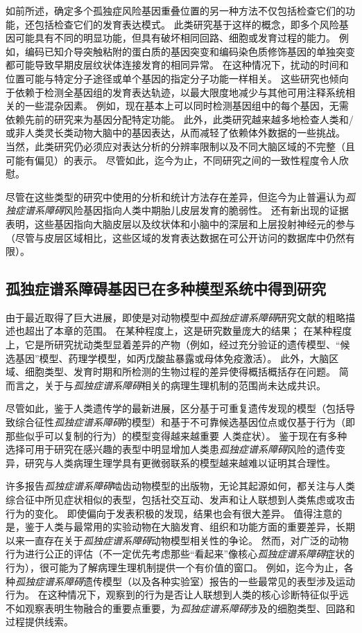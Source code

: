 如前所述，确定多个孤独症风险基因重叠位置的另一种方法不仅包括检查它们的功能，还包括检查它们的发育表达模式。
此类研究基于这样的概念，即多个风险基因可能具有不同的明显功能，但具有破坏相同回路、细胞或发育过程的能力。
例如，编码已知介导突触粘附的蛋白质的基因突变和编码染色质修饰基因的单独突变都可能导致早期皮层纹状体连接发育的相同异常。
在这种情况下，扰动的时间和位置可能与特定分子途径或单个基因的指定分子功能一样相关。
这些研究也倾向于依赖于检测全基因组的发育表达轨迹，以最大限度地减少与其他可用注释系统相关的一些混杂因素。
例如，现在基本上可以同时检测基因组中的每个基因，无需依赖先前的研究来为基因分配特定功能。
此外，此类研究越来越多地检查人类和/或非人类灵长类动物大脑中的基因表达，从而减轻了依赖体外数据的一些挑战。
当然，此类研究仍必须应对表达分析的分辨率限制以及不同大脑区域的不完整（且可能有偏见）的表示。
尽管如此，迄今为止，不同研究之间的一致性程度令人欣慰。


尽管在这些类型的研究中使用的分析和统计方法存在差异，但迄今为止普遍认为\textit{孤独症谱系障碍}风险基因指向人类中期胎儿皮层发育的脆弱性。
还有新出现的证据表明，这些基因指向大脑皮层以及纹状体和小脑中的深层和上层投射神经元的参与（尽管与皮层区域相比，这些区域的发育表达数据在可公开访问的数据库中仍然有限）。



\subsection{孤独症谱系障碍基因已在多种模型系统中得到研究}

由于最近取得了巨大进展，即使是对动物模型中\textit{孤独症谱系障碍}研究文献的粗略描述也超出了本章的范围。
在某种程度上，这是研究数量庞大的结果； 在某种程度上，它是所研究扰动类型显着差异的产物（例如，经过充分验证的遗传模型、“候选基因”模型、药理学模型，如丙戊酸盐暴露或母体免疫激活）。
此外，大脑区域、细胞类型、发育时期和所检测的生物过程的差异使得概括概括存在问题。
简而言之，关于与\textit{孤独症谱系障碍}相关的病理生理机制的范围尚未达成共识。


尽管如此，鉴于人类遗传学的最新进展，区分基于可重复遗传发现的模型（包括导致综合征性\textit{孤独症谱系障碍}的模型）和基于不可靠候选基因位点或仅基于行为（即那些似乎可以复制的行为）的模型变得越来越重要 人类症状）。
鉴于现在有多种选择可用于研究在感兴趣的表型中明显增加人类患\textit{孤独症谱系障碍}风险的遗传变异，研究与人类病理生理学具有更微弱联系的模型越来越难以证明其合理性。


许多报告\textit{孤独症谱系障碍}啮齿动物模型的出版物，无论其起源如何，都关注与人类综合征中所见症状相似的表型，包括社交互动、发声和让人联想到人类焦虑或攻击行为的变化。
即使偏向于发表积极的发现，结果也会有很大差异。
值得注意的是，鉴于人类与最常用的实验动物在大脑发育、组织和功能方面的重要差异，长期以来一直存在关于\textit{孤独症谱系障碍}动物模型相关性的争论。
然而，对广泛的动物行为进行公正的评估（不一定优先考虑那些“看起来”像核心\textit{孤独症谱系障碍}症状的行为），很可能为了解病理生理机制提供一个有价值的窗口。
例如，迄今为止，各种\textit{孤独症谱系障碍}遗传模型（以及各种实验室）报告的一些最常见的表型涉及运动行为。
在这种情况下，观察到的行为是否让人联想到人类的核心诊断特征似乎远不如观察表明生物融合的重要点重要，为\textit{孤独症谱系障碍}涉及的细胞类型、回路和过程提供线索。


